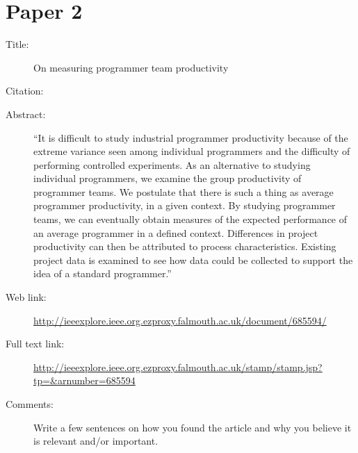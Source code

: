 \documentclass{scrartcl}
\begin{document}
\section*{Paper 2}
\begin{description}
\item[Title:] On measuring programmer team productivity
\item[Citation:] \cite{bibtex_key}
\item[Abstract:] ``It is difficult to study industrial programmer productivity because of the extreme variance seen among individual programmers and the difficulty of performing controlled experiments. As an alternative to studying individual programmers, we examine the group productivity of programmer teams. We postulate that there is such a thing as average programmer productivity, in a given context. By studying programmer teams, we can eventually obtain measures of the expected performance of an average programmer in a defined context. Differences in project productivity can then be attributed to process characteristics. Existing project data is examined to see how data could be collected to support the idea of a standard programmer.''
\item[Web link:] \url{http://ieeexplore.ieee.org.ezproxy.falmouth.ac.uk/document/685594/}
\item[Full text link:] \url{http://ieeexplore.ieee.org.ezproxy.falmouth.ac.uk/stamp/stamp.jsp?tp=&arnumber=685594}
\item[Comments:] Write a few sentences on how you found the article and why you believe it is relevant and/or important.
\end{description}
\end{document}
